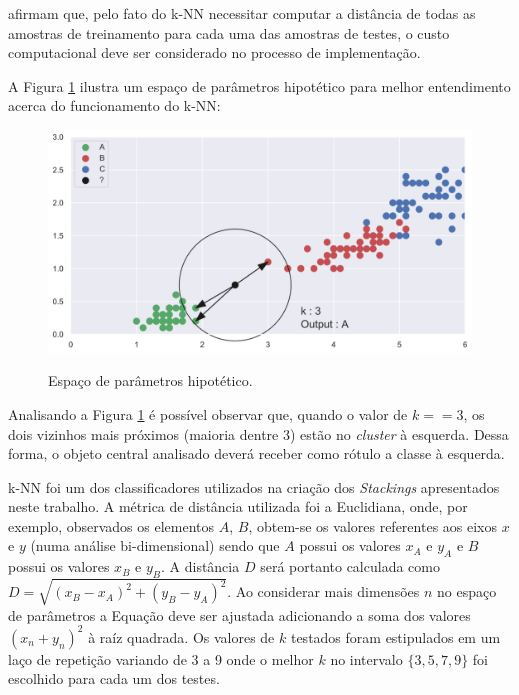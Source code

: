  afirmam que, pelo fato do k-NN necessitar computar a distância de todas as amostras de treinamento para cada uma das amostras de testes, o custo computacional deve ser considerado no processo de implementação.

A Figura \ref{fig:knn_exemplo} ilustra um espaço de parâmetros hipotético para melhor entendimento acerca do funcionamento do k-NN:


\begin{figure}[H]
\centering
\caption{Espaço de parâmetros hipotético.}
\includegraphics[width=12cm,keepaspectratio]{figs/knn_exemplo.png}
\newline {}\label{fig:knn_exemplo}
\end{figure}


Analisando a Figura \ref{fig:knn_exemplo} é possível observar que, quando o valor de $k == 3$, os dois vizinhos mais próximos (maioria dentre 3) estão no \textit{cluster} à esquerda. Dessa forma, o objeto central analisado deverá receber como rótulo a classe à esquerda.

k-NN foi um dos classificadores utilizados na criação dos \textit{Stackings} apresentados neste trabalho. A métrica de distância utilizada foi a Euclidiana, onde, por exemplo, observados os elementos $A$, $B$, obtem-se os valores referentes aos eixos $x$ e $y$ (numa análise bi-dimensional) sendo que $A$ possui os valores $x_{A}$ e $y_{A}$ e $B$ possui os valores $x_{B}$ e $y_{B}$. A distância $D$ será portanto calculada como $D = \sqrt{(x_{B} - x_{A})^2 + (y_{B} - y_{A})^2}$. Ao considerar mais dimensões $n$ no espaço de parâmetros a Equação deve ser ajustada adicionando a soma dos valores $(x_{n} + y_{n})^2$ à raíz quadrada. Os valores de $k$ testados foram estipulados em um laço de repetição variando de 3 a 9 onde o melhor $k$ no intervalo $\{3, 5, 7, 9\}$ foi escolhido para cada um dos testes.


